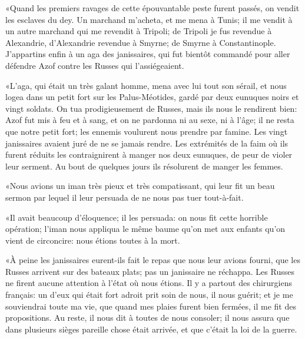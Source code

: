 «Quand les premiers ravages de cette épouvantable peste furent passés,
on vendit les esclaves du dey. Un marchand m’acheta, et me mena à
Tunis; il me vendit à un autre marchand qui me revendit à Tripoli; de
Tripoli je fus revendue à Alexandrie, d’Alexandrie revendue à Smyrne;
de Smyrne à Constantinople. J’appartins enfin à un aga des janissaires,
qui fut bientôt commandé pour aller défendre Azof contre les Russes qui
l’assiégeaient.

«L’aga, qui était un très galant homme, mena avec lui tout son sérail,
et nous logea dans un petit fort sur les Palus-Méotides, gardé par deux
eunuques noirs et vingt soldats. On tua prodigieusement de Russes, mais
ils nous le rendirent bien: Azof fut mis à feu et à sang, et on ne
pardonna ni au sexe, ni à l’âge; il ne resta que notre petit fort; les
ennemis voulurent nous prendre par famine. Les vingt janissaires
avaient juré de ne se jamais rendre. Les extrémités de la faim où ils
furent réduits les contraignirent à manger nos deux eunuques, de peur
de violer leur serment. Au bout de quelques jours ils résolurent de
manger les femmes.


«Nous avions un iman très pieux et très compatissant, qui leur fit un
beau sermon par lequel il leur persuada de ne nous pas tuer
tout-à-fait. \localleftbox{}

«Il avait beaucoup d’éloquence; il les persuada: on nous fit cette
horrible opération; l’iman nous appliqua le même baume qu’on met aux
enfants qu’on vient de circoncire: nous étions toutes à la mort.


«À peine les janissaires eurent-ils fait le repas que nous leur avions
fourni, que les Russes arrivent sur des bateaux plats; pas un
janissaire ne réchappa. Les Russes ne firent aucune attention à l’état
où nous étions. Il y a partout des chirurgiens français: un d’eux qui
était fort adroit prit soin de nous, il nous guérit; et je me
souviendrai toute ma vie, que quand mes plaies furent bien fermées, il
me fit des propositions. Au reste, il nous dit à toutes de nous
consoler; il nous assura que dans plusieurs sièges pareille chose était
arrivée, et que c’était la loi de la guerre.


